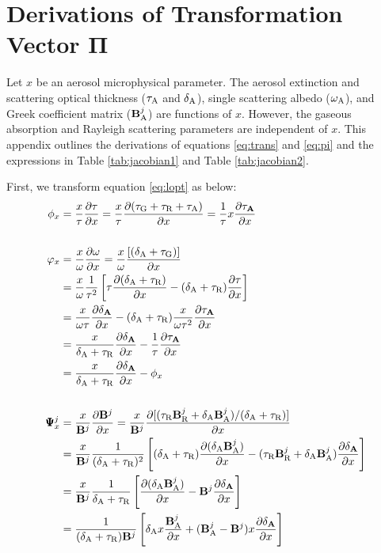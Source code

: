 \chapter{Derivations of Transformation Vector $\pmb{\Pi}$} \label{app:pi}

Let $x$ be an aerosol microphysical parameter. The aerosol extinction and
scattering optical thickness ($\tau_\text{A}$ and $\delta_\text{A}$), single scattering albedo
($\omega_\text{A}$), and Greek coefficient matrix ($\mathbf{B}_\text{A}^j$) are functions of $x$. 
However, the gaseous absorption and Rayleigh scattering parameters are 
independent of $x$. This appendix outlines the derivations of equations 
\eqref{eq:trans} and \eqref{eq:pi} and the expressions in
Table \ref{tab:jacobian1} and Table \ref{tab:jacobian2}. 

First, we transform equation \eqref{eq:lopt} as below:
\begingroup
\allowdisplaybreaks
\begin{align}
\phi_x &= \frac{x}{\tau}\frac{\partial\tau}{\partial x} 
        = \frac{x}{\tau}\frac{\partial(\tau_\text{G}+\tau_\text{R}+\tau_\text{A})}{\partial x} 
        = \frac{1}{\tau}x\frac{\partial\tau_\mathbf{A}}{\partial x} \label{eq:phix1} \\
        \nonumber \\
\varphi_x 
        &= \frac{x}{\omega}\frac{\partial\omega}{\partial x} 
         = \frac{x}{\omega}\frac{[(\delta_\text{A}+\tau_\text{G})]}{\partial x}
         \nonumber \\
        &= \frac{x}{\omega}\frac{1}{\tau^2}
           \left[ \tau\frac{\partial{(\delta_\text{A}+\tau_\text{R})}}{\partial x}
                - (\delta_\text{A}+\tau_\text{R})\frac{\partial\tau}{\partial x}\right]
         \nonumber \\
        &= \frac{x}{\omega\tau}\frac{\partial\delta_\mathbf{A}}{\partial x}
           -(\delta_\text{A}+\tau_\text{R})\frac{x}{\omega\tau^2}\frac{\partial\tau_\mathbf{A}}{\partial x}
         \nonumber \\
        &= \frac{x}{\delta_\text{A}+\tau_\text{R}}\frac{\partial\delta_\mathbf{A}}{\partial x}
           -\frac{1}{\tau}\frac{\partial\tau_\mathbf{A}}{\partial x}
         \nonumber \\
        &= \frac{x}{\delta_\text{A}+\tau_\text{R}}\frac{\partial\delta_\mathbf{A}}{\partial x} - \phi_x \label{eq:phix2}\\
         \nonumber \\
\pmb{\Psi}_x^j 
        &= \frac{x}{\mathbf{B}^j}\frac{\partial\mathbf{B}^j}{\partial x} 
         = \frac{x}{\mathbf{B}^j}\frac{\partial{[(\tau_\text{R}\mathbf{B}_\text{R}^j+\delta_\text{A}\mathbf{B}_\text{A}^j)/(\delta_\text{A}+\tau_\text{R})]}}{\partial x}
         \nonumber \\
        &= \frac{x}{\mathbf{B}^j}\frac{1}{(\delta_\text{A}+\tau_\text{R})^2}\left[
           (\delta_\text{A}+\tau_\text{R})\frac{\partial(\delta_\text{A}\mathbf{B}_\text{A}^j)}{\partial x}
           - (\tau_\text{R}\mathbf{B}_\text{R}^j+\delta_\text{A}\mathbf{B}_\text{A}^j)\frac{\partial\delta_\mathbf{A}}{\partial x}\right]
         \nonumber \\
        &= \frac{x}{\mathbf{B}^j}\frac{1}{\delta_\text{A}+\tau_\text{R}} \left[
           \frac{\partial(\delta_\text{A}\mathbf{B}_\text{A}^j)}{\partial x}-\mathbf{B}^j\frac{\partial\delta_\mathbf{A}}{\partial x}\right]
         \nonumber \\
        &= \frac{1}{(\delta_\text{A}+\tau_\text{R})\mathbf{B}^j} \left[ 
           \delta_\text{A} x\frac{\mathbf{B}_\text{A}^j}{\partial x}+(\mathbf{B}_\text{A}^j-\mathbf{B}^j)x\frac{\partial\delta_\mathbf{A}}{\partial x}
           \right] \label{eq:phix3}
\end{align}
\endgroup

